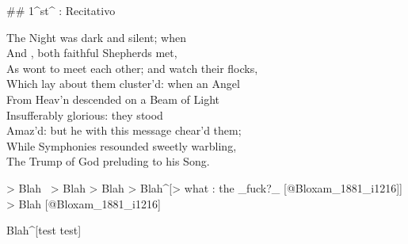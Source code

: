 ## 1^st^ \mvmt: Recitativo

\begin{linenumbers}
The Night was dark and silent; when  \\
And , both faithful Shepherds met,  \\
As wont to meet each other; and watch their flocks,  \\
Which lay about them cluster’d: when an Angel  \\
From Heav’n descended on a Beam of Light  \\
Insufferably glorious: they stood  \\
Amaz’d: but he with this message chear’d them;  \\
While Symphonies resounded sweetly warbling,  \\
The Trump of God preluding to his Song.
\end{linenumbers}

> Blah \
> Blah
> Blah
> Blah^[> what : the _fuck?_ [@Bloxam_1881_i1216]]
> Blah [@Bloxam_1881_i1216]


Blah^[test test]
